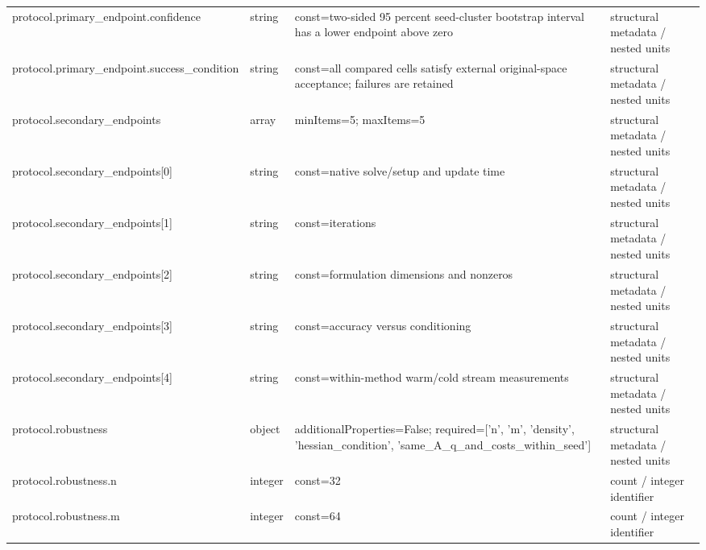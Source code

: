 \begin{longtable}{@{}>{\raggedright\arraybackslash}p{}>{\raggedright\arraybackslash}p{}>{\raggedright\arraybackslash}p{}>{\raggedright\arraybackslash}p{}@{}}
protocol.\allowbreak{}primary\_\allowbreak{}endpoint.\allowbreak{}confidence & string & const=\allowbreak{}two-\allowbreak{}sided 95 percent seed-\allowbreak{}cluster bootstrap interval has a lower endpoint above zero & structural metadata /\allowbreak{} nested units\\
protocol.\allowbreak{}primary\_\allowbreak{}endpoint.\allowbreak{}success\_\allowbreak{}condition & string & const=\allowbreak{}all compared cells satisfy external original-\allowbreak{}space acceptance; failures are retained & structural metadata /\allowbreak{} nested units\\
protocol.\allowbreak{}secondary\_\allowbreak{}endpoints & array & minItems=\allowbreak{}5; maxItems=\allowbreak{}5 & structural metadata /\allowbreak{} nested units\\
protocol.\allowbreak{}secondary\_\allowbreak{}endpoints[0] & string & const=\allowbreak{}native solve/\allowbreak{}setup and update time & structural metadata /\allowbreak{} nested units\\
protocol.\allowbreak{}secondary\_\allowbreak{}endpoints[1] & string & const=\allowbreak{}iterations & structural metadata /\allowbreak{} nested units\\
protocol.\allowbreak{}secondary\_\allowbreak{}endpoints[2] & string & const=\allowbreak{}formulation dimensions and nonzeros & structural metadata /\allowbreak{} nested units\\
protocol.\allowbreak{}secondary\_\allowbreak{}endpoints[3] & string & const=\allowbreak{}accuracy versus conditioning & structural metadata /\allowbreak{} nested units\\
protocol.\allowbreak{}secondary\_\allowbreak{}endpoints[4] & string & const=\allowbreak{}within-\allowbreak{}method warm/\allowbreak{}cold stream measurements & structural metadata /\allowbreak{} nested units\\
protocol.\allowbreak{}robustness & object & additionalProperties=\allowbreak{}False; required=\allowbreak{}['n', 'm', 'density', 'hessian\_\allowbreak{}condition', 'same\_\allowbreak{}A\_\allowbreak{}q\_\allowbreak{}and\_\allowbreak{}costs\_\allowbreak{}within\_\allowbreak{}seed'] & structural metadata /\allowbreak{} nested units\\
protocol.\allowbreak{}robustness.\allowbreak{}n & integer & const=\allowbreak{}32 & count /\allowbreak{} integer identifier\\
protocol.\allowbreak{}robustness.\allowbreak{}m & integer & const=\allowbreak{}64 & count /\allowbreak{} integer identifier\\

\end{longtable}
